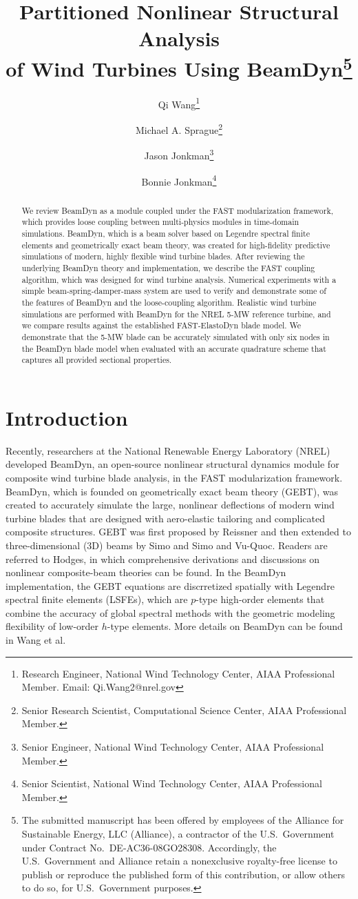\documentclass{aiaa-tc}
\title{Partitioned Nonlinear Structural Analysis\\
of Wind Turbines Using BeamDyn\thanks{The submitted manuscript has been offered by employees
of the Alliance for Sustainable Energy, LLC (Alliance), a contractor of the U.S.\
Government under Contract No.\ DE-AC36-08GO28308.  Accordingly, the U.S.\
Government and Alliance retain a nonexclusive royalty-free license to publish or
reproduce the published form of this contribution, or allow others to do so, for
U.S.\ Government purposes.} }
\author[]{Qi Wang\thanks{Research Engineer, National Wind Technology Center, AIAA Professional Member. Email: Qi.Wang2@nrel.gov}}
\author[]{Michael A. Sprague\thanks{Senior Research Scientist, 
Computational Science Center, AIAA Professional Member.}}
\author[]{Jason Jonkman\thanks{Senior Engineer, National Wind Technology Center, AIAA Professional Member.}}
\author[]{Bonnie Jonkman\thanks{Senior Scientist, National Wind Technology Center, AIAA Professional Member.}}
\affil[]{National Renewable Energy Laboratory, Golden, CO 80401}
\begin{document}
\maketitle

\begin{abstract}
{We review BeamDyn as a module coupled under the FAST modularization framework, which provides loose coupling between multi-physics modules in time-domain simulations.
BeamDyn, which is a beam solver based on Legendre spectral finite elements and geometrically exact beam theory, was created for high-fidelity predictive simulations of modern, highly flexible wind turbine blades.  
After reviewing the underlying BeamDyn theory and implementation, we describe the FAST coupling algorithm, which was designed for wind turbine analysis.  
Numerical experiments with a simple beam-spring-damper-mass system are used to verify and demonstrate some of the features of BeamDyn and the loose-coupling algorithm.  
Realistic wind turbine simulations are performed with BeamDyn for the NREL 5-MW reference turbine, and we compare results against the established FAST-ElastoDyn blade model.  
We demonstrate that the 5-MW blade can be accurately simulated with only six nodes in the BeamDyn blade model when evaluated with an accurate quadrature scheme that captures all provided sectional properties.}
\end{abstract}

\section{Introduction} 
Recently, researchers at the National Renewable Energy Laboratory (NREL) 
developed BeamDyn\cite{Wang:SFE2013,Wang:GEBT2014,Wang-etal:2015,website:beamdyn}, an open-source nonlinear structural dynamics module for composite wind turbine blade analysis, in the FAST modularization framework.   
BeamDyn, which is founded on geometrically exact beam theory (GEBT), was created to accurately simulate the large, nonlinear deflections of modern wind turbine blades that are designed with aero-elastic tailoring and complicated composite structures.
GEBT was first proposed by Reissner\cite{Ressiner1973} and then extended to three-dimensional (3D) beams by Simo\cite{Simo1985} and Simo and Vu-Quoc\cite{Simo1986}. 
Readers are referred to
Hodges,\cite{HodgesBeamBook} in which comprehensive derivations and discussions
on nonlinear composite-beam theories can be found. 
In the BeamDyn implementation, the GEBT equations are discrretized spatially with Legendre spectral finite elements (LSFEs), which are $p$-type high-order elements that combine the accuracy of global spectral methods with the geometric modeling flexibility of low-order $h$-type elements.
More details on BeamDyn can be found in Wang et al.\cite{Wang:GEBT2014}
\end{document}
